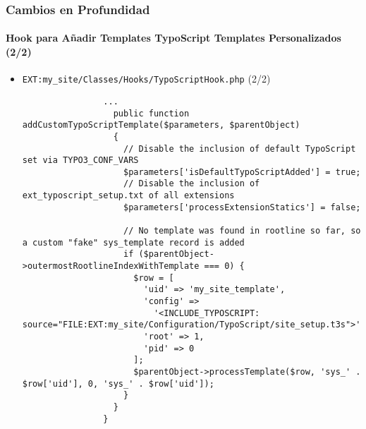 \begin{frame}[fragile]
	\frametitle{Cambios en Profundidad}
	\framesubtitle{Hook para Añadir Templates TypoScript Templates Personalizados (2/2)}

	\lstset{basicstyle=\tiny\ttfamily}

	\begin{itemize}
		\item \texttt{EXT:my\_site/Classes/Hooks/TypoScriptHook.php} (2/2)

			\begin{lstlisting}
				...
				  public function addCustomTypoScriptTemplate($parameters, $parentObject)
				  {
				    // Disable the inclusion of default TypoScript set via TYPO3_CONF_VARS
				    $parameters['isDefaultTypoScriptAdded'] = true;
				    // Disable the inclusion of ext_typoscript_setup.txt of all extensions
				    $parameters['processExtensionStatics'] = false;

				    // No template was found in rootline so far, so a custom "fake" sys_template record is added
				    if ($parentObject->outermostRootlineIndexWithTemplate === 0) {
				      $row = [
				        'uid' => 'my_site_template',
				        'config' =>
					      '<INCLUDE_TYPOSCRIPT: source="FILE:EXT:my_site/Configuration/TypoScript/site_setup.t3s">',
				        'root' => 1,
				        'pid' => 0
				      ];
				      $parentObject->processTemplate($row, 'sys_' . $row['uid'], 0, 'sys_' . $row['uid']);
				    }
				  }
				}
			\end{lstlisting}

	\end{itemize}

\end{frame}

